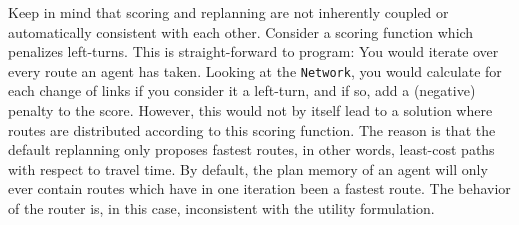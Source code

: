 Keep in mind that scoring and replanning are not inherently coupled or automatically consistent with each other. 
Consider a scoring function which penalizes left-turns. This is straight-forward to program: You would 
iterate over every route an agent has taken. Looking at the \lstinline$Network$, you would calculate for each change of
links if you consider it a left-turn, and if so, add a (negative) penalty to the score. However, this would not by itself lead to a
solution where routes are distributed according to this scoring function. The reason is that the default replanning only proposes
 fastest routes, in other words, least-cost paths with respect to travel time. By default, the plan memory of an agent will only ever
 contain routes which have in one iteration been a fastest route. The behavior of the router is, in this case, inconsistent with the utility
 formulation.
   



